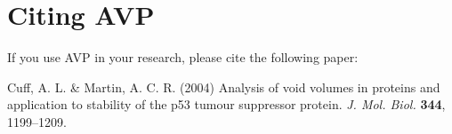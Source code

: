 \documentclass{article}
\begin{document}
\section{Citing AVP}

If you use AVP in your research, please cite the following paper:
\vspace{1em}

\noindent Cuff, A. L. \& Martin, A. C. R. (2004) Analysis of void
volumes in proteins and application to stability of the p53 tumour
suppressor protein. \emph{J. Mol. Biol.} {\bfseries 344}, 1199--1209.





\end{document}
